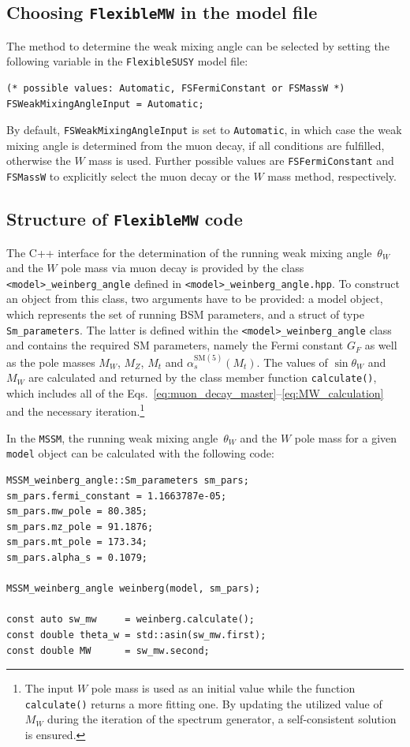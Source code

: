 \documentclass[final,3p,11pt,pdflatex]{elsarticle}
\makeatletter
\newcommand{\modelname}[1]{\texttt{#1}\@\xspace}
\newcommand{\fs}{\texttt{FlexibleSUSY}\@\xspace}
\newcommand{\fmw}{\texttt{FlexibleMW}\@\xspace}
\newcommand{\code}[1]{\lstinline|#1|}  %
\newcommand{\SM}{\ensuremath{\text{SM}}\xspace}
\def\as{\alpha_s}
\makeatother
\begin{document}
\subsection{Choosing \fmw in the model file}
%
The method to determine the weak mixing angle can be selected by
setting the following variable in the \fs model file:
%
\begin{lstlisting}
(* possible values: Automatic, FSFermiConstant or FSMassW *)
FSWeakMixingAngleInput = Automatic;
\end{lstlisting}
%
By default, \code{FSWeakMixingAngleInput} is set to \code{Automatic},
in which case the weak mixing angle is determined from the muon decay,
if all conditions are fulfilled, otherwise the $W$ mass is used.
Further possible values are \code{FSFermiConstant} and
\code{FSMassW} to explicitly select the muon decay or the $W$ mass method,
respectively.

\subsection{Structure of \fmw code}
%
The C++ interface for the determination of the running weak mixing
angle~$\theta_W$ and the $W$ pole mass via muon decay is provided by the class
\code{<model>_weinberg_angle} defined in
\code{<model>_weinberg_angle.hpp}.  To construct an object from this
class, two arguments have to be provided: a model object, which
represents the set of running BSM parameters, and a struct of type
\code{Sm_parameters}. The latter is defined within the
\code{<model>_weinberg_angle} class and contains the required SM parameters,
namely the Fermi constant $G_F$ as well as the pole
masses $M_W$, $M_Z$, $M_t$ and $\as^{\SM(5)}(M_t)$.
The values of $\sin\theta_W$ and $M_W$ are calculated and returned by
the class member function \code{calculate()}, which includes all of the
Eqs.~\eqref{eq:muon_decay_master}--\eqref{eq:MW_calculation} and the
necessary iteration.\footnote{The input $W$ pole mass is used as an
initial value while the function \code{calculate()} returns a more fitting
one. By updating the utilized value of $M_W$ during the iteration of the
spectrum generator, a self-consistent solution is ensured.}
%
\begin{example}
  In the \modelname{MSSM}, the running weak mixing angle~$\theta_W$ and the
  $W$ pole mass for a given \code{model} object can be calculated with
  the following code:
%
\begin{lstlisting}
MSSM_weinberg_angle::Sm_parameters sm_pars;
sm_pars.fermi_constant = 1.1663787e-05;
sm_pars.mw_pole = 80.385;
sm_pars.mz_pole = 91.1876;
sm_pars.mt_pole = 173.34;
sm_pars.alpha_s = 0.1079;

MSSM_weinberg_angle weinberg(model, sm_pars);

const auto sw_mw     = weinberg.calculate();
const double theta_w = std::asin(sw_mw.first);
const double MW      = sw_mw.second;
\end{lstlisting}
\end{example}
%
\end{document}
